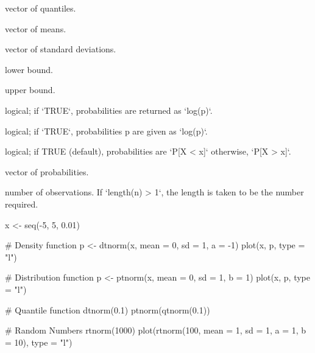 \documentclass[a4paper]{book}
\begin{document}
%
\begin{Arguments}
\begin{ldescription}
\item[\code{x}] vector of quantiles.

\item[\code{mean}] vector of means.

\item[\code{sd}] vector of standard deviations.

\item[\code{a}] lower bound.

\item[\code{b}] upper bound.

\item[\code{log}] logical; if `TRUE`, probabilities are returned as `log(p)`.

\item[\code{log.p}] logical; if `TRUE`, probabilities p are given as `log(p)`.

\item[\code{lower.tail}] logical; if TRUE (default), probabilities are `P[X < x]` otherwise, `P[X > x]`.

\item[\code{p}] vector of probabilities.

\item[\code{n}] number of observations. If `length(n) > 1`, the length is taken to be the number required.
\end{ldescription}
\end{Arguments}
%
\begin{Examples}
\begin{ExampleCode}
x <- seq(-5, 5, 0.01)

# Density function
p <- dtnorm(x, mean = 0, sd = 1, a = -1)
plot(x, p, type = "l")

# Distribution function
p <- ptnorm(x, mean = 0, sd = 1, b = 1)
plot(x, p, type = "l")

# Quantile function
dtnorm(0.1)
ptnorm(qtnorm(0.1))

# Random Numbers
rtnorm(1000)
plot(rtnorm(100, mean = 1, sd = 1, a = 1, b = 10), type = "l")

\end{ExampleCode}
\end{Examples}
\printindex{}
\end{document}
